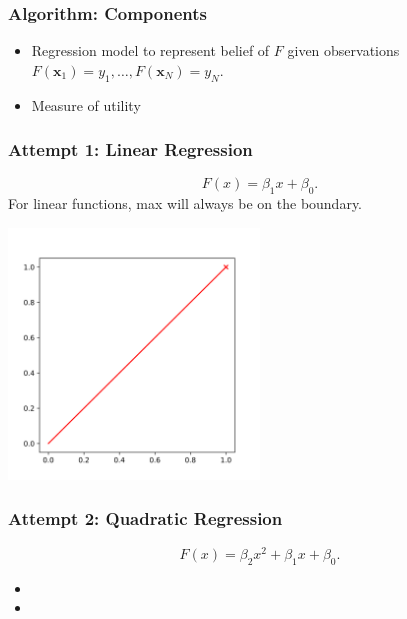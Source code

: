 \documentclass{beamer}
\begin{document}
\begin{frame}
    \frametitle{Algorithm: Components}
    \begin{itemize}
        \item Regression model to represent belief of $F$ given observations $F(\mathbf{x}_1) = y_1, \dots, F(\mathbf{x}_N) = y_N$.
            \pause
        \item Measure of utility
    \end{itemize}
\end{frame}

\begin{frame}
    \frametitle{Attempt 1: Linear Regression}
    \begin{equation*}
        F(x) = \beta_1 x + \beta_0.
    \end{equation*}
    \pause
    For linear functions, max will always be on the boundary.
    \begin{center}
        \includegraphics[width=0.5\textwidth]{fig/linear.png}
    \end{center}
\end{frame}

\begin{frame}
    \frametitle{Attempt 2: Quadratic Regression}
    \begin{equation*}
        F(x) = \beta_2 x^2 + \beta_1 x + \beta_0.
    \end{equation*}
    \pause
    \begin{itemize}
        \item  {}
            \pause
        \item {}
    \end{itemize}
\end{frame}
\end{document}
